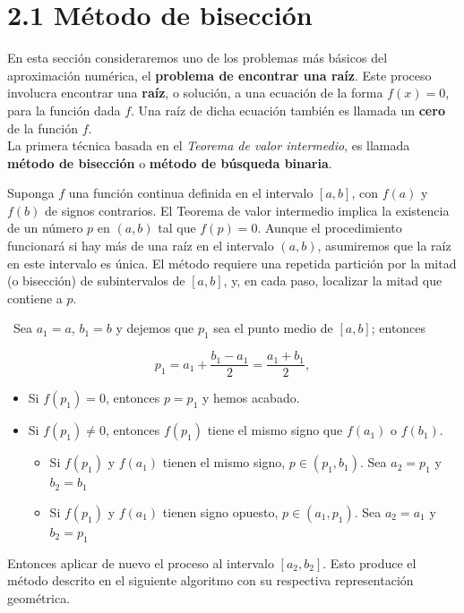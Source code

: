 \section*{2.1 Método de bisección}

En esta sección consideraremos uno de los problemas más básicos del aproximación numérica, el \textbf{problema de encontrar una raíz}. Este proceso involucra encontrar una \textbf{raíz}, o solución, a una ecuación de la forma $f(x)=0$, para la función dada $f$. Una raíz de dicha ecuación también es llamada un \textbf{cero} de la función $f$.
\\

La primera técnica basada en el \textit{Teorema de valor intermedio}, es llamada \textbf{método de bisección} o \textbf{método de búsqueda binaria}.

Suponga $f$ una función continua definida en el intervalo $[a,b]$, con $f(a)$ y $f(b)$ de signos contrarios. El Teorema de valor intermedio implica la existencia de un número $p$ en $(a,b)$ tal que $f(p)=0$. Aunque el procedimiento funcionará si hay más de una raíz en el intervalo $(a,b)$, asumiremos que la raíz en este intervalo es única. El método requiere una repetida partición por la mitad (o bisección) de subintervalos de $[a,b]$, y, en cada paso, localizar la mitad que contiene a $p$.

\ Sea $a_1=a$, $b_1=b$ y dejemos que $p_1$ sea el punto medio de $[a,b]$; entonces

\begin{equation*}
    p_1=a_1+\frac{b_1-a_1}{2}=\frac{a_1+b_1}{2},
\end{equation*}

\begin{itemize}
    \item Si $f(p_1)=0$, entonces $p=p_1$ y hemos acabado.
    \item Si $f(p_1)\neq0$, entonces $f(p_1)$ tiene el mismo signo que $f(a_1)$ o $f(b_1)$.
    \begin{itemize}
        \item  Si $f(p_1)$ y $f(a_1)$ tienen el mismo signo, $p\in(p_1,b_1)$. Sea $a_2=p_1$ y $b_2=b_1$
        \item  Si $f(p_1)$ y $f(a_1)$ tienen signo opuesto, $p\in(a_1,p_1)$. Sea $a_2=a_1$ y $b_2=p_1$
    \end{itemize}
\end{itemize}

Entonces aplicar de nuevo el proceso al intervalo $[a_2,b_2]$. Esto produce el método descrito en el siguiente algoritmo con su respectiva representación geométrica.

